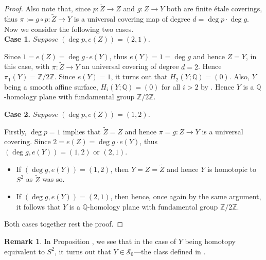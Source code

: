 \documentclass[12pt,reqno,twoside]{amsart}
\theoremstyle{definition}
\newtheorem{remark}[theorem]{Remark}
\numberwithin{equation}{section}
\newcommand{\Q}{\mathbb{Q}}
\newcommand{\Z}{\mathbb{Z}}
\newcommand{\wt}{\widetilde}
\begin{document}
\begin{proof}
    Also note that, since $p:\wt{Z} \to Z$ and $g:Z\to Y$ both are finite {\'e}tale coverings, thus $\pi:=g\circ p:\wt{Z} \to Y$ is a universal covering map of degree $d=\deg p\cdot \deg g$. Now we consider the following two cases.\\
    
    {\bf Case 1.} \emph{Suppose $(\deg p, e(Z))=(2,1)$.}
    
    \medskip
    Since $1=e(Z)=\deg g\cdot e(Y)$, thus $e(Y)=1=\deg g$ and hence $Z=Y$, in this case, with $\pi:\wt{Z}\to Y$ an universal covering of degree $d=2$. Hence $\pi_1(Y)=\Z/2\Z$. Since $e(Y)=1$, it turns out that $H_2(Y;\Q)=(0)$. Also, $Y$ being a smooth affine surface, $H_i(Y;\Q)=(0)$ for all $i>2$ by \cite[Theorem 1]{AF1959}. Hence $Y$ is a $\Q$-homology plane with fundamental group $\Z/2\Z$.

    {\bf Case 2.} \emph{Suppose $(\deg p, e(Z))=(1,2)$.}
    
    \medskip
    Firstly, $\deg p=1$ implies that $\wt{Z}=Z$ and hence $\pi=g: Z \to Y$ is a universal covering. Since $2=e(Z)=\deg g\cdot e(Y)$, thus $(\deg g, e(Y))=(1,2) \text{ or } (2,1)$. 
    \begin{itemize}[\indent---]
        \item If $(\deg g, e(Y))=(1,2)$, then $Y=Z=\wt{Z}$ and hence $Y$ is homotopic to $S^2$ as $\wt{Z}$ was so.\\[-0.25 cm]
        \item If $(\deg g, e(Y))=(2,1)$, then hence, once again by the same argument, it follows that $Y$ is a $\Q$-homology plane with fundamental group $\Z/2\Z$.
    \end{itemize}

    Both cases together rest the proof.
\end{proof}

\begin{remark}
    In Proposition \label{Prop: Affine surface properly dominated by 2-torus and with finite pi_1}, we see that in the case of $Y$ being homotopy equivalent to $S^2$, it turns out that $Y\in \mathcal{S}_0$---the class defined in \cite{JSXZ2024}.
\end{remark}
\end{document}
